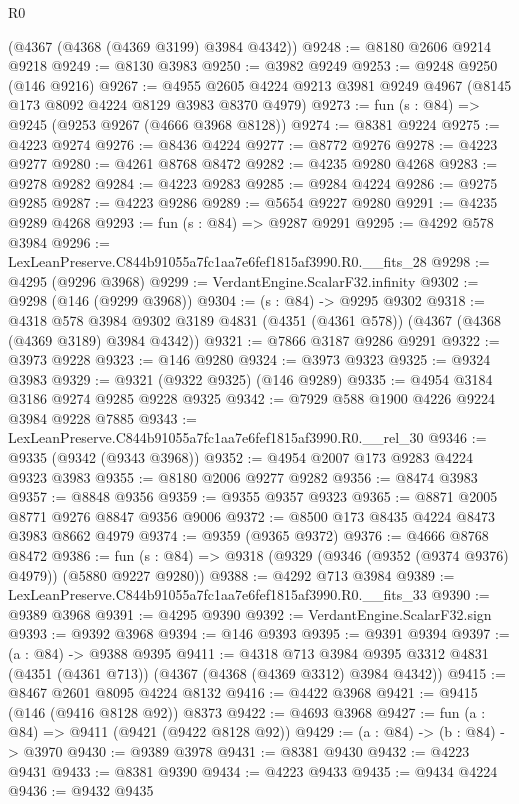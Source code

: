 \begin{lexlean}{R0}
\begin{coremodule}
    (@4367 (@4368 (@4369 @3199) @3984 @4342))
@9248 := @8180 @2606 @9214 @9218
@9249 := @8130 @3983
@9250 := @3982 @9249
@9253 := @9248 @9250 (@146 @9216)
@9267 := @4955 @2605 @4224 @9213 @3981 @9249 @4967 (@8145 @173 @8092 @4224 @8129 @3983 @8370 @4979)
@9273 := fun (s : @84) => @9245 (@9253 @9267 (@4666 @3968 @8128))
@9274 := @8381 @9224
@9275 := @4223 @9274
@9276 := @8436 @4224
@9277 := @8772 @9276
@9278 := @4223 @9277
@9280 := @4261 @8768 @8472
@9282 := @4235 @9280 @4268
@9283 := @9278 @9282
@9284 := @4223 @9283
@9285 := @9284 @4224
@9286 := @9275 @9285
@9287 := @4223 @9286
@9289 := @5654 @9227 @9280
@9291 := @4235 @9289 @4268
@9293 := fun (s : @84) => @9287 @9291
@9295 := @4292 @578 @3984
@9296 := LexLeanPreserve.C844b91055a7fc1aa7e6fef1815af3990.R0.__fits_28
@9298 := @4295 (@9296 @3968)
@9299 := VerdantEngine.ScalarF32.infinity
@9302 := @9298 (@146 (@9299 @3968))
@9304 := (s : @84) -> @9295 @9302
@9318 := @4318
    @578
    @3984
    @9302
    @3189
    @4831
    (@4351 (@4361 @578))
    (@4367 (@4368 (@4369 @3189) @3984 @4342))
@9321 := @7866 @3187 @9286 @9291
@9322 := @3973 @9228
@9323 := @146 @9280
@9324 := @3973 @9323
@9325 := @9324 @3983
@9329 := @9321 (@9322 @9325) (@146 @9289)
@9335 := @4954 @3184 @3186 @9274 @9285 @9228 @9325
@9342 := @7929 @588 @1900 @4226 @9224 @3984 @9228 @7885
@9343 := LexLeanPreserve.C844b91055a7fc1aa7e6fef1815af3990.R0.__rel_30
@9346 := @9335 (@9342 (@9343 @3968))
@9352 := @4954 @2007 @173 @9283 @4224 @9323 @3983
@9355 := @8180 @2006 @9277 @9282
@9356 := @8474 @3983
@9357 := @8848 @9356
@9359 := @9355 @9357 @9323
@9365 := @8871 @2005 @8771 @9276 @8847 @9356 @9006
@9372 := @8500 @173 @8435 @4224 @8473 @3983 @8662 @4979
@9374 := @9359 (@9365 @9372)
@9376 := @4666 @8768 @8472
@9386 := fun (s : @84) => @9318 (@9329 (@9346 (@9352 (@9374 @9376) @4979)) (@5880 @9227 @9280))
@9388 := @4292 @713 @3984
@9389 := LexLeanPreserve.C844b91055a7fc1aa7e6fef1815af3990.R0.__fits_33
@9390 := @9389 @3968
@9391 := @4295 @9390
@9392 := VerdantEngine.ScalarF32.sign
@9393 := @9392 @3968
@9394 := @146 @9393
@9395 := @9391 @9394
@9397 := (a : @84) -> @9388 @9395
@9411 := @4318
    @713
    @3984
    @9395
    @3312
    @4831
    (@4351 (@4361 @713))
    (@4367 (@4368 (@4369 @3312) @3984 @4342))
@9415 := @8467 @2601 @8095 @4224 @8132
@9416 := @4422 @3968
@9421 := @9415 (@146 (@9416 @8128 @92)) @8373
@9422 := @4693 @3968
@9427 := fun (a : @84) => @9411 (@9421 (@9422 @8128 @92))
@9429 := (a : @84) -> (b : @84) -> @3970
@9430 := @9389 @3978
@9431 := @8381 @9430
@9432 := @4223 @9431
@9433 := @8381 @9390
@9434 := @4223 @9433
@9435 := @9434 @4224
@9436 := @9432 @9435

\end{coremodule}
\end{lexlean}

